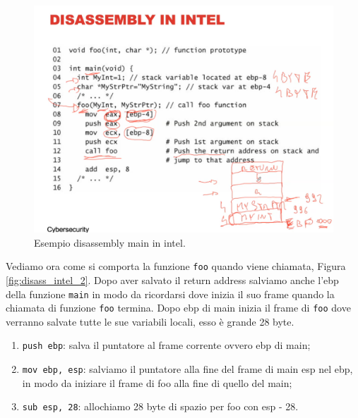 \begin{figure}[H]
    \centering
    \includegraphics[width=13cm, keepaspectratio]{capitoli/secure_coding/img/cap_2/disass_intel_1.png}
    \caption{Esempio disassembly main in intel.}\label{fig:disass_intel_1}
\end{figure}

Vediamo ora come si comporta la funzione \verb|foo| quando viene chiamata,
Figura \ref{fig:disass_intel_2}. Dopo aver salvato il return address salviamo anche
l'ebp della funzione \verb|main| in modo da ricordarsi dove inizia il suo frame
quando la chiamata di funzione \verb|foo| termina. Dopo ebp di main inizia il
frame di \verb|foo| dove verranno salvate tutte le sue variabili locali,
esso è grande 28 byte.

\begin{enumerate}
    \item \verb|push ebp|: salva il puntatore al frame corrente ovvero ebp di main;
    \item \verb|mov ebp, esp|: salviamo il puntatore alla fine del frame di main
          esp nel ebp, in modo da iniziare il frame di foo alla fine di quello del main;
    \item \verb|sub esp, 28|: allochiamo 28 byte di spazio per foo con esp - 28.
\end{enumerate}

